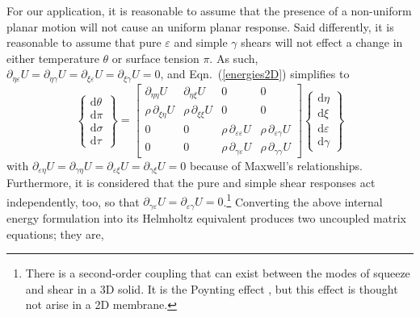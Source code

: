 For our application, it is reasonable to assume that the presence of a non-uniform planar motion will not cause an uniform planar response.  Said differently, it is reasonable to assume that pure $\varepsilon$ and simple $\gamma$ shears will not effect a change in either temperature $\theta$ or surface tension $\pi$.  As such, $\partial_{\eta\varepsilon} U = \partial_{\eta\gamma} U = \partial_{\xi\varepsilon} U = \partial_{\xi\gamma} U = 0$, and Eqn.~(\ref{energies2D}) simplifies to
\begin{displaymath}
\left\{ \begin{matrix}
\mathrm{d} \theta \\ \mathrm{d} \pi \\
\mathrm{d} \sigma \\ \mathrm{d} \tau
\end{matrix} \right\} = \begin{bmatrix}
\partial_{\eta\eta} U & 
\partial_{\eta\xi} U & 
0 & 0 \\ 
\rho \, \partial_{\xi\eta} U & 
\rho \, \partial_{\xi\xi} U & 
0 & 0 \\
0 & 0 & 
\rho \, \partial_{\varepsilon\varepsilon} U & 
\rho \, \partial_{\varepsilon\gamma} U \\
0 & 0 & 
\rho \, \partial_{\gamma\varepsilon} U & 
\rho \, \partial_{\gamma\gamma} U 
\end{bmatrix} 
\left\{ \begin{matrix}
\mathrm{d}\eta \\ \mathrm{d} \xi \\
\mathrm{d} \varepsilon \\ \mathrm{d} \gamma
\end{matrix} \right\} 
\end{displaymath}
with $\partial_{\varepsilon\eta} U = \partial_{\gamma\eta} U = \partial_{\varepsilon\xi} U = \partial_{\gamma\xi} U = 0$ because of Maxwell's relationships.  Furthermore, it is considered that the pure and simple shear responses act independently, too, so that $\partial_{\gamma\varepsilon} U = \partial_{\varepsilon\gamma} U = 0$.\footnote{
    There is a second-order coupling that can exist between the modes of squeeze and shear in a 3D solid.  It is the Poynting effect \cite{FreedZamani19}, but this effect is thought not arise in a 2D membrane.
}
Converting the above internal energy formulation into its Helmholtz equivalent produces two uncoupled matrix equations; they are,
